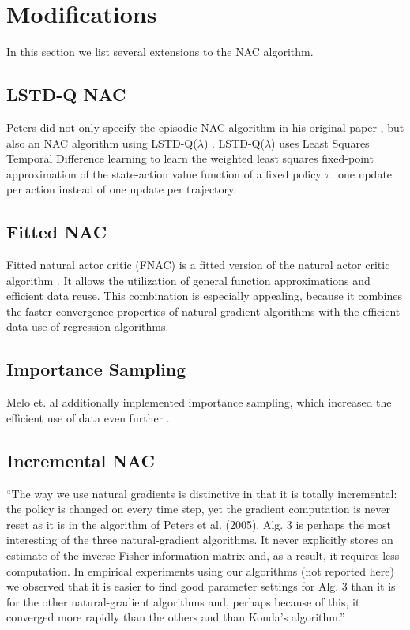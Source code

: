\newpage
\section{Modifications}
In this section we list several extensions to the NAC algorithm. 

\subsection{LSTD-Q NAC}

Peters did not only specify the episodic NAC algorithm in his original paper \citep{peters2005natural}, but also an NAC algorithm using LSTD-Q($\lambda$) \citep{lagoudakis2003least, boyan2002technical}. LSTD-Q($\lambda$) uses Least Squares Temporal Difference learning to learn the weighted least squares fixed-point approximation of the state-action value function of a fixed policy $\pi$. one update per action instead of one update per trajectory.


\subsection{Fitted NAC}
Fitted natural actor critic (FNAC) is a fitted version of the natural actor critic algorithm \cite{melo2008fitted}. It allows the utilization of general function approximations and efficient data reuse. This combination is especially appealing, because it combines the faster convergence properties of natural gradient algorithms with the efficient data use of regression algorithms.

\subsection{Importance Sampling}
Melo et. al additionally implemented importance sampling, which increased the efficient use of data even further \cite{melo2008fitted}.

\subsection{Incremental NAC}
``The way we use natural gradients is distinctive in that it is totally incremental: the policy is changed on every time step, yet the gradient computation is never reset as it is in the algorithm of Peters et al. (2005). Alg. 3 is perhaps the most interesting of the three natural-gradient algorithms. It never explicitly stores an estimate of the inverse Fisher information matrix and, as a result, it requires less computation. In empirical experiments using our algorithms (not reported here) we observed that it is easier to ﬁnd good parameter settings for Alg. 3 than it is for the other natural-gradient algorithms and, perhaps because of this, it converged more rapidly than the others and than Konda’s algorithm.'' \cite{bhatnagar2008incremental}

